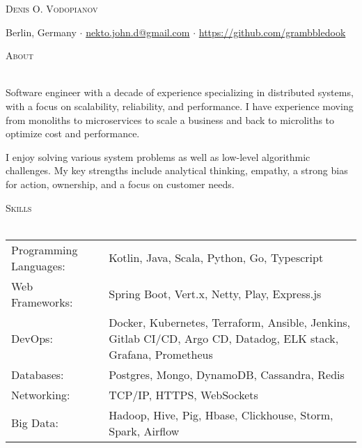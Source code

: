 \documentclass[a4paper]{article}
\makeatletter
\newcommand{\lineunder} {
    \vspace*{-8pt} \\
    \hspace*{-18pt} \hrulefill \\
}
\newcommand{\header} [1] {
        {\hspace*{-18pt}\vspace*{6pt} \textsc{#1}}
    \vspace*{-6pt} \lineunder
}
\def\email{nekto.john.d@gmail.com}
\def\phone{555-55-55}
\makeatother
\begin{document}
    \vspace*{-40pt}


    \vspace*{-10pt}
    \begin{center}
        \Huge \scshape {Denis O. Vodopianov} \\ \vspace{1mm}
    \end{center}

    \begin{center}
        Berlin, Germany $\cdot$
        \href{mailto:\email}{\email} $\cdot$
        \url{https://github.com/grambbledook}\\
    \end{center}

    \header{About}
    \begin{raggedright}
        Software engineer with a decade of experience specializing in distributed systems, with a focus on scalability, reliability, and performance.
        I have experience moving from monoliths to microservices to scale a business and back to microliths
        to optimize cost and performance. \break

        I enjoy solving various system problems as well as low-level algorithmic challenges.
        My key strengths include analytical thinking, empathy, a strong bias for action, ownership, and a focus on customer needs. \\
    \end{raggedright}
    \vspace{2mm}

    \header{Skills}
    \begin{tabularx}{\textwidth}{p{5cm} X}
        Programming Languages: & Kotlin, Java, Scala, Python, Go, Typescript                                                                     \\
        Web Frameworks:        & Spring Boot, Vert.x, Netty, Play, Express.js                                                                    \\
        DevOps:                & Docker, Kubernetes, Terraform, Ansible, Jenkins, Gitlab CI/CD, Argo CD, Datadog, ELK stack, Grafana, Prometheus \\
        Databases:             & Postgres, Mongo, DynamoDB, Cassandra, Redis                                                                     \\
        Networking:            & TCP/IP, HTTPS, WebSockets                                                                                       \\
        Big Data:              & Hadoop, Hive, Pig, Hbase, Clickhouse, Storm, Spark, Airflow                                                     \\
    \end{tabularx}
    \vspace{2mm}
\end{document}
